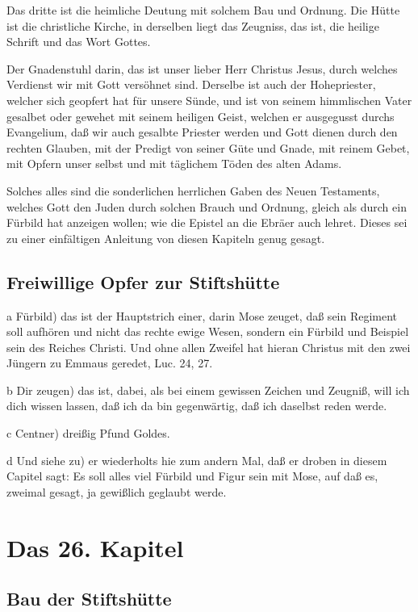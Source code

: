 Das dritte ist die heimliche Deutung mit solchem Bau und Ordnung. Die Hütte ist die christliche Kirche, in derselben liegt das Zeugniss, das ist, die heilige Schrift und das Wort Gottes.

Der Gnadenstuhl darin, das ist unser lieber Herr Christus Jesus, durch welches Verdienst wir mit Gott versöhnet sind. Derselbe ist auch der Hohepriester, welcher sich geopfert hat für unsere Sünde, und ist von seinem himmlischen Vater gesalbet oder gewehet mit seinem heiligen Geist, welchen er ausgegusst durchs Evangelium, daß wir auch gesalbte Priester werden und Gott dienen durch den rechten Glauben, mit der Predigt von seiner Güte und Gnade, mit reinem Gebet, mit Opfern unser selbst und mit täglichem Töden des alten Adams.

Solches alles sind die sonderlichen herrlichen Gaben des Neuen Testaments, welches Gott den Juden durch solchen Brauch und Ordnung, gleich als durch ein Fürbild hat anzeigen wollen; wie die Epistel an die Ebräer auch lehret. Dieses sei zu einer einfältigen Anleitung von diesen Kapiteln genug gesagt.

\section{Freiwillige Opfer zur Stiftshütte}

a Fürbild) das ist der Hauptstrich einer, darin Mose zeuget, daß sein Regiment soll aufhören und nicht das rechte ewige Wesen, sondern ein Fürbild und Beispiel sein des Reiches Christi. Und ohne allen Zweifel hat hieran Christus mit den zwei Jüngern zu Emmaus geredet, Luc. 24, 27.

b Dir zeugen) das ist, dabei, als bei einem gewissen Zeichen und Zeugniß, will ich dich wissen lassen, daß ich da bin gegenwärtig, daß ich daselbst reden werde.

c Centner) dreißig Pfund Goldes.

d Und siehe zu) er wiederholts hie zum andern Mal, daß er droben in diesem Capitel sagt: Es soll alles viel Fürbild und Figur sein mit Mose, auf daß es, zweimal gesagt, ja gewißlich geglaubt werde.

\chapter{Das 26. Kapitel}

\section{Bau der Stiftshütte}

